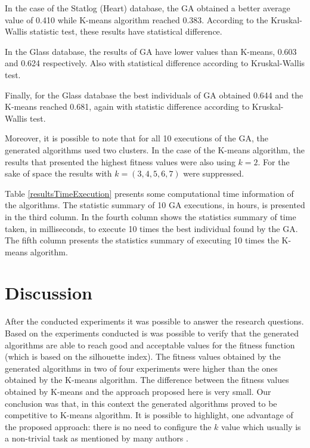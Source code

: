 \documentclass[journal]{IEEEtran}
\begin{document}
	In the case of the Statlog (Heart) database,  the GA obtained a better average value of 0.410 while K-means algorithm reached 0.383. According to the Kruskal-Wallis statistic test, these results have statistical difference.
	
	In the Glass database, the results of GA have lower values than K-means, 0.603 and 0.624 respectively. Also with statistical difference according to Kruskal-Wallis test. 
	
	Finally, for the Glass database the best individuals of GA obtained 0.644 and the K-means reached 0.681, again with statistic difference according to Kruskal-Wallis test.
	
	Moreover, it is possible to note that for all 10 executions of the GA, the generated algorithms used two clusters. In the case of the K-means algorithm, the results that presented the highest fitness values were also using $k=2$. For the sake of space the results with $k = (3,4,5,6,7)$ were suppressed.
	
	Table \ref{resultsTimeExecution} presents some computational time information of the algorithms. The statistic summary of 10 GA executions, in hours, is presented in the third column. In the fourth column shows the statistics summary of time taken, in milliseconds, to execute 10 times the best individual found by the GA. The fifth column presents the statistics summary of executing 10 times the K-means algorithm.
	
	
	\section{Discussion} \label{sec:discussion}
	
	After the conducted experiments it was possible to answer the research questions. Based on the experiments conducted is was possible to verify that the generated algorithms are able to reach good and acceptable values for the  fitness function (which is based on the silhouette index). The fitness values obtained by the generated algorithms in two of four experiments were higher than the ones obtained by the K-means algorithm. The difference between the fitness values obtained by K-means and the approach proposed here is very small. Our conclusion was that, in this context the generated algorithms proved to be competitive to K-means algorithm. It is possible to highlight, one advantage of the proposed approach: there is no need to configure the $k$ value which usually is a non-trivial task as mentioned by many authors \cite{pham2005selection, yan2005methods, tibshirani2001estimating}.
	
\end{document}
